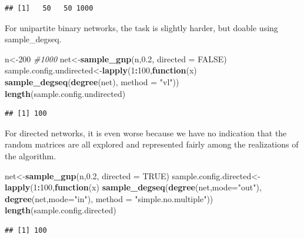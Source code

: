 \documentclass[
]{book}
\newenvironment{Shaded}{\begin{snugshade}}{\end{snugshade}}
\newcommand{\AttributeTok}[1]{\textcolor[rgb]{0.13,0.29,0.53}{#1}}
\newcommand{\CommentTok}[1]{\textcolor[rgb]{0.56,0.35,0.01}{\textit{#1}}}
\newcommand{\ConstantTok}[1]{\textcolor[rgb]{0.56,0.35,0.01}{#1}}
\newcommand{\ControlFlowTok}[1]{\textcolor[rgb]{0.13,0.29,0.53}{\textbf{#1}}}
\newcommand{\DecValTok}[1]{\textcolor[rgb]{0.00,0.00,0.81}{#1}}
\newcommand{\FloatTok}[1]{\textcolor[rgb]{0.00,0.00,0.81}{#1}}
\newcommand{\FunctionTok}[1]{\textcolor[rgb]{0.13,0.29,0.53}{\textbf{#1}}}
\newcommand{\NormalTok}[1]{#1}
\newcommand{\OtherTok}[1]{\textcolor[rgb]{0.56,0.35,0.01}{#1}}
\newcommand{\SpecialCharTok}[1]{\textcolor[rgb]{0.81,0.36,0.00}{\textbf{#1}}}
\newcommand{\StringTok}[1]{\textcolor[rgb]{0.31,0.60,0.02}{#1}}
\theoremstyle{definition}
\theoremstyle{definition}
\theoremstyle{definition}
\theoremstyle{definition}
\theoremstyle{remark}
\begin{document}
\begin{verbatim}
## [1]   50   50 1000
\end{verbatim}

For unipartite binary networks, the task is slightly harder, but doable using sample\_degseq.

\begin{Shaded}
\begin{Highlighting}[]
\NormalTok{n}\OtherTok{\textless{}{-}}\DecValTok{200} \CommentTok{\#1000}
\NormalTok{net}\OtherTok{\textless{}{-}}\FunctionTok{sample\_gnp}\NormalTok{(n,}\FloatTok{0.2}\NormalTok{, }\AttributeTok{directed =} \ConstantTok{FALSE}\NormalTok{)}
\NormalTok{sample.config.undirected}\OtherTok{\textless{}{-}}\FunctionTok{lapply}\NormalTok{(}\DecValTok{1}\SpecialCharTok{:}\DecValTok{100}\NormalTok{,}\ControlFlowTok{function}\NormalTok{(x) }\FunctionTok{sample\_degseq}\NormalTok{(}\FunctionTok{degree}\NormalTok{(net), }\AttributeTok{method =} \StringTok{"vl"}\NormalTok{))}
\FunctionTok{length}\NormalTok{(sample.config.undirected)}
\end{Highlighting}
\end{Shaded}

\begin{verbatim}
## [1] 100
\end{verbatim}

For directed networks, it is even worse because we have no indication that the random matrices are all explored and represented fairly among the realizations of the algorithm.

\begin{Shaded}
\begin{Highlighting}[]
\NormalTok{net}\OtherTok{\textless{}{-}}\FunctionTok{sample\_gnp}\NormalTok{(n,}\FloatTok{0.2}\NormalTok{, }\AttributeTok{directed =} \ConstantTok{TRUE}\NormalTok{)}
\NormalTok{sample.config.directed}\OtherTok{\textless{}{-}}\FunctionTok{lapply}\NormalTok{(}\DecValTok{1}\SpecialCharTok{:}\DecValTok{100}\NormalTok{,}\ControlFlowTok{function}\NormalTok{(x) }\FunctionTok{sample\_degseq}\NormalTok{(}\FunctionTok{degree}\NormalTok{(net,}\AttributeTok{mode=}\StringTok{"out"}\NormalTok{), }\FunctionTok{degree}\NormalTok{(net,}\AttributeTok{mode=}\StringTok{"in"}\NormalTok{), }\AttributeTok{method =} \StringTok{"simple.no.multiple"}\NormalTok{))}
\FunctionTok{length}\NormalTok{(sample.config.directed)}
\end{Highlighting}
\end{Shaded}

\begin{verbatim}
## [1] 100
\end{verbatim}
\end{document}
